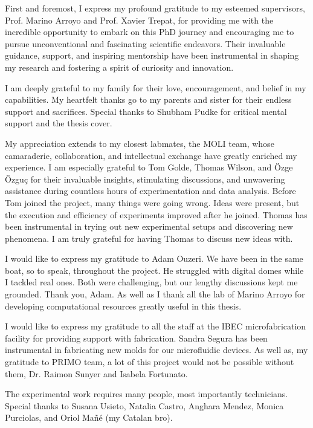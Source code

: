 \begin{Acknowledgements}
	First and foremost, I express my profound gratitude to my esteemed supervisors, Prof. Marino Arroyo and Prof. Xavier Trepat, for providing me with the incredible opportunity to embark on this PhD journey and encouraging me to pursue unconventional and fascinating scientific endeavors. Their invaluable guidance, support, and inspiring mentorship have been instrumental in shaping my research and fostering a spirit of curiosity and innovation.
	
	I am deeply grateful to my family for their love, encouragement, and belief in my capabilities. My heartfelt thanks go to my parents and sister for their endless support and sacrifices. Special thanks to Shubham Pudke for critical mental support and the thesis cover.
	
	My appreciation extends to my closest labmates, the MOLI team, whose camaraderie, collaboration, and intellectual exchange have greatly enriched my experience. I am especially grateful to Tom Golde, Thomas Wilson, and Özge Özguç for their invaluable insights, stimulating discussions, and unwavering assistance during countless hours of experimentation and data analysis. Before Tom joined the project, many things were going wrong. Ideas were present, but the execution and efficiency of experiments improved after he joined. Thomas has been instrumental in trying out new experimental setups and discovering new phenomena. I am truly grateful for having Thomas to discuss new ideas with.
	
	I would like to express my gratitude to Adam Ouzeri. We have been in the same boat, so to speak, throughout the project. He struggled with digital domes while I tackled real ones. Both were challenging, but our lengthy discussions kept me grounded. Thank you, Adam. As well as I thank all the lab of Marino Arroyo for developing  computational resources greatly useful in this thesis.
	
	I would like to express my gratitude to all the staff at the IBEC microfabrication facility for providing support with fabrication. Sandra Segura has been instrumental in fabricating new molds for our microfluidic devices. As well as, my gratitude to PRIMO team, a lot of this project would not be possible without them, Dr. Raimon Sunyer and Isabela Fortunato.
	
	The experimental work requires many people, most importantly technicians. Special thanks to Susana Usieto, Natalia Castro, Anghara Mendez, Monica Purciolas, and Oriol Mañé (my Catalan bro).
	

\end{Acknowledgements}
